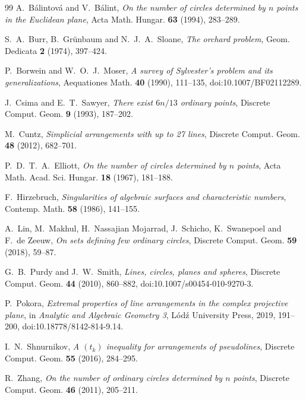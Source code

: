 \documentclass[11pt,a4paper]{ctexart}
\theoremstyle{definition}
\begin{document}
\begin{thebibliography}{99}
\small
{}
A.~B\'alintov\'a and V.~B\'alint,
\emph{On the number of circles determined by $n$ points in the Euclidean plane},
Acta Math. Hungar. \textbf{63} (1994), 283--289.

S.~A.~Burr, B.~Grünbaum and N.~J.~A.~Sloane,
\emph{The orchard problem},
Geom. Dedicata \textbf{2} (1974), 397--424.

P.~Borwein and W.~O.~J.~Moser,
\emph{A survey of Sylvester's problem and its generalizations},
Aequationes Math. \textbf{40} (1990), 111--135,
doi:10.1007/BF02112289.

J.~Csima and E.~T.~Sawyer,
\emph{There exist $6n/13$ ordinary points},
Discrete Comput. Geom. \textbf{9} (1993), 187--202.

M.~Cuntz,
\emph{Simplicial arrangements with up to 27 lines},
Discrete Comput. Geom. \textbf{48} (2012), 682--701.

P.~D.~T.~A.~Elliott,
\emph{On the number of circles determined by $n$ points},
Acta Math. Acad. Sci. Hungar. \textbf{18} (1967), 181--188.

F.~Hirzebruch,
\emph{Singularities of algebraic surfaces and characteristic numbers},
Contemp. Math. \textbf{58} (1986), 141--155.

A.~Lin, M.~Makhul, H.~Nassajian Mojarrad, J.~Schicho,
K.~Swanepoel and F.~de Zeeuw,
\emph{On sets defining few ordinary circles},
Discrete Comput. Geom. \textbf{59} (2018), 59--87.

G.~B.~Purdy and J.~W.~Smith,
\emph{Lines, circles, planes and spheres},
Discrete Comput. Geom. \textbf{44} (2010), 860--882,
doi:10.1007/s00454-010-9270-3.

P.~Pokora,
\emph{Extremal properties of line arrangements in the complex projective plane},
in \emph{Analytic and Algebraic Geometry 3}, L\'od\'z University Press, 2019,
191--200, doi:10.18778/8142-814-9.14.

I.~N.~Shnurnikov,
\emph{A $(t_k)$ inequality for arrangements of pseudolines},
Discrete Comput. Geom. \textbf{55} (2016), 284--295.

R.~Zhang,
\emph{On the number of ordinary circles determined by $n$ points},
Discrete Comput. Geom. \textbf{46} (2011), 205--211.
\end{thebibliography}
\end{document}
